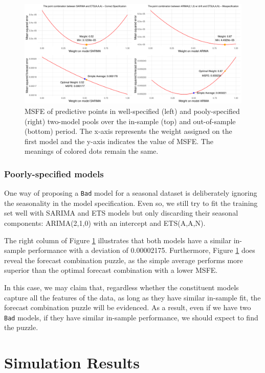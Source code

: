 \documentclass{monashthesis}
\begin{document}
\begin{figure}[ht]
\centering
\includegraphics[scale=0.5]{figures/EMPL.pdf}
\caption{MSFE of predictive points in well-specified (left) and pooly-specified (right) two-model pools over the in-sample (top) and out-of-sample (bottom) period. The x-axis represents the weight assigned on the first model and the y-axis indicates the value of MSFE. The meanings of colored dots remain the same.}
\label{fig:sd}
\end{figure}

\hypertarget{poorly-specified-models}{%
\subsection{Poorly-specified models}\label{poorly-specified-models}}

One way of proposing a \texttt{Bad} model for a seasonal dataset is deliberately ignoring the seasonality in the model specification. Even so, we still try to fit the training set well with SARIMA and ETS models but only discarding their seasonal components: ARIMA(2,1,0) with an intercept and ETS(A,A,N).

The right column of Figure \ref{fig:sd} illustrates that both models have a similar in-sample performance with a deviation of 0.00002175. Furthermore, Figure \ref{fig:sd} does reveal the forecast combination puzzle, as the simple average performs more superior than the optimal forecast combination with a lower MSFE.

In this case, we may claim that, regardless whether the constituent models capture all the features of the data, as long as they have similar in-sample fit, the forecast combination puzzle will be evidenced. As a result, even if we have two \texttt{Bad} models, if they have similar in-sample performance, we should expect to find the puzzle.

\hypertarget{simulation-results}{%
\chapter{Simulation Results}\label{simulation-results}}
\end{document}
